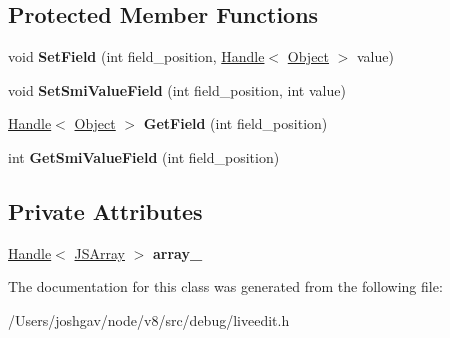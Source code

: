 \subsection*{Protected Member Functions}
\begin{DoxyCompactItemize}
\item 
void {\bfseries Set\+Field} (int field\+\_\+position, \hyperlink{classv8_1_1internal_1_1_handle}{Handle}$<$ \hyperlink{classv8_1_1internal_1_1_object}{Object} $>$ value)\hypertarget{classv8_1_1internal_1_1_j_s_array_based_struct_a14217c3ef41671c329fb2c3d98fcdcc6}{}\label{classv8_1_1internal_1_1_j_s_array_based_struct_a14217c3ef41671c329fb2c3d98fcdcc6}

\item 
void {\bfseries Set\+Smi\+Value\+Field} (int field\+\_\+position, int value)\hypertarget{classv8_1_1internal_1_1_j_s_array_based_struct_a55544bc5706d1319d3a7799ea3dfa328}{}\label{classv8_1_1internal_1_1_j_s_array_based_struct_a55544bc5706d1319d3a7799ea3dfa328}

\item 
\hyperlink{classv8_1_1internal_1_1_handle}{Handle}$<$ \hyperlink{classv8_1_1internal_1_1_object}{Object} $>$ {\bfseries Get\+Field} (int field\+\_\+position)\hypertarget{classv8_1_1internal_1_1_j_s_array_based_struct_ab86e2bb490cf245c84a5fe933bedcf85}{}\label{classv8_1_1internal_1_1_j_s_array_based_struct_ab86e2bb490cf245c84a5fe933bedcf85}

\item 
int {\bfseries Get\+Smi\+Value\+Field} (int field\+\_\+position)\hypertarget{classv8_1_1internal_1_1_j_s_array_based_struct_a1df722228329f7455e111d3ae49dccb6}{}\label{classv8_1_1internal_1_1_j_s_array_based_struct_a1df722228329f7455e111d3ae49dccb6}

\end{DoxyCompactItemize}
\subsection*{Private Attributes}
\begin{DoxyCompactItemize}
\item 
\hyperlink{classv8_1_1internal_1_1_handle}{Handle}$<$ \hyperlink{classv8_1_1internal_1_1_j_s_array}{J\+S\+Array} $>$ {\bfseries array\+\_\+}\hypertarget{classv8_1_1internal_1_1_j_s_array_based_struct_a353f9fb523b8fc4a4d6b77ada39bcb9a}{}\label{classv8_1_1internal_1_1_j_s_array_based_struct_a353f9fb523b8fc4a4d6b77ada39bcb9a}

\end{DoxyCompactItemize}


The documentation for this class was generated from the following file\+:\begin{DoxyCompactItemize}
\item 
/\+Users/joshgav/node/v8/src/debug/liveedit.\+h\end{DoxyCompactItemize}
